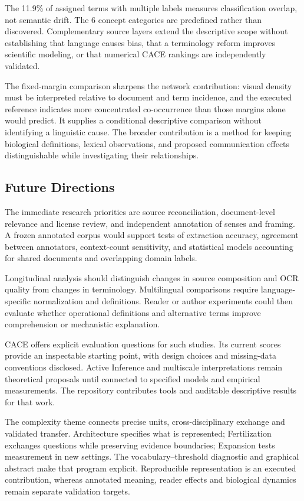 \documentclass[
]{article}
\numberwithin{equation}{section}
\begin{document}
The 11.9\% of assigned terms with multiple labels measures
classification overlap, not semantic drift. The 6 concept categories are
predefined rather than discovered. Complementary source layers extend
the descriptive scope without establishing that language causes bias,
that a terminology reform improves scientific modeling, or that
numerical CACE rankings are independently validated.

The fixed-margin comparison sharpens the network contribution: visual
density must be interpreted relative to document and term incidence, and
the executed reference indicates more concentrated co-occurrence than
those margins alone would predict. It supplies a conditional descriptive
comparison without identifying a linguistic cause. The broader
contribution is a method for keeping biological definitions, lexical
observations, and proposed communication effects distinguishable while
investigating their relationships.

\subsection{Future Directions}\label{future-directions}

The immediate research priorities are source reconciliation,
document-level relevance and license review, and independent annotation
of senses and framing. A frozen annotated corpus would support tests of
extraction accuracy, agreement between annotators, context-count
sensitivity, and statistical models accounting for shared documents and
overlapping domain labels.

Longitudinal analysis should distinguish changes in source composition
and OCR quality from changes in terminology. Multilingual comparisons
require language-specific normalization and definitions. Reader or
author experiments could then evaluate whether operational definitions
and alternative terms improve comprehension or mechanistic explanation.

CACE offers explicit evaluation questions for such studies. Its current
scores provide an inspectable starting point, with design choices and
missing-data conventions disclosed. Active Inference and multiscale
interpretations remain theoretical proposals until connected to
specified models and empirical measurements. The repository contributes
tools and auditable descriptive results for that work.

The complexity theme connects precise units, cross-disciplinary exchange
and validated transfer. Architecture specifies what is represented;
Fertilization exchanges questions while preserving evidence boundaries;
Expansion tests measurement in new settings. The vocabulary--threshold
diagnostic and graphical abstract make that program explicit.
Reproducible representation is an executed contribution, whereas
annotated meaning, reader effects and biological dynamics remain
separate validation targets.
\end{document}
